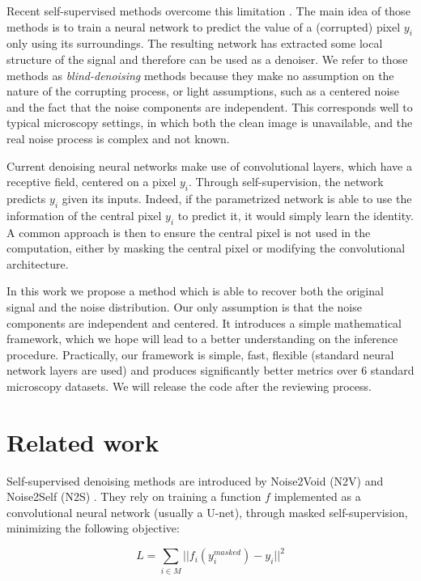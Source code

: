 \documentclass{article}
\begin{document}
Recent self-supervised methods overcome this limitation \cite{batson2019noise2self,krull2018noise2void}. The main idea of those methods is to train a neural network to predict the value of a (corrupted) pixel $y_i$ only using its surroundings. The resulting network has extracted some local structure of the signal and therefore can be used as a denoiser. We refer to those methods as \textit{blind-denoising} methods because they make no assumption on the nature of the corrupting process, or light assumptions, such as a centered noise and the fact that the noise components are independent. This corresponds well to typical microscopy settings, in which both the clean image is unavailable, and the real noise process is complex and not known.

Current denoising neural networks make use of convolutional layers, which have a receptive field, centered on a pixel $y_i$. Through self-supervision, the network predicts $y_i$ given its inputs. Indeed, if the parametrized network is able to use the information of the central pixel $y_i$ to predict it, it would simply learn the identity. A common approach is then to ensure the central pixel is not used in the computation, either by masking the central pixel or modifying the convolutional architecture.

In this work we propose a method which is able to recover both the original signal and the noise distribution. Our only assumption is that the noise components are independent and centered. It introduces a simple mathematical framework, which we hope will lead to a better understanding on the inference procedure. Practically, our framework is simple, fast, flexible (standard neural network layers are used) and produces significantly better metrics over 6 standard microscopy datasets. We will release the code after the reviewing process.

\section{Related work}
\label{sec:related}

Self-supervised denoising methods are introduced by Noise2Void (N2V) \cite{krull2018noise2void} and Noise2Self (N2S) \cite{batson2019noise2self}. They rely on training a function $f$ implemented as a convolutional neural network (usually a U-net), through masked self-supervision, minimizing the following objective:

$$L = \sum_{i \in M} ||f_i(y^{masked}_i) - y_i||^2 $$
\end{document}
